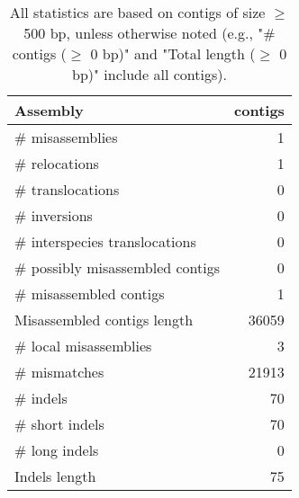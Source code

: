 \documentclass[12pt,a4paper]{article}
\begin{document}
\begin{table}[ht]
\begin{center}
\caption{All statistics are based on contigs of size $\geq$ 500 bp, unless otherwise noted (e.g., "\# contigs ($\geq$ 0 bp)" and "Total length ($\geq$ 0 bp)" include all contigs).}
\begin{tabular}{|l*{1}{|r}|}
\hline
Assembly & contigs \\ \hline
\# misassemblies & 1 \\ \hline
\hspace{5mm}\# relocations & 1 \\ \hline
\hspace{5mm}\# translocations & 0 \\ \hline
\hspace{5mm}\# inversions & 0 \\ \hline
\hspace{5mm}\# interspecies translocations & 0 \\ \hline
\# possibly misassembled contigs & 0 \\ \hline
\# misassembled contigs & 1 \\ \hline
Misassembled contigs length & 36059 \\ \hline
\# local misassemblies & 3 \\ \hline
\# mismatches & 21913 \\ \hline
\# indels & 70 \\ \hline
\hspace{5mm}\# short indels & 70 \\ \hline
\hspace{5mm}\# long indels & 0 \\ \hline
Indels length & 75 \\ \hline
\end{tabular}
\end{center}
\end{table}
\end{document}
